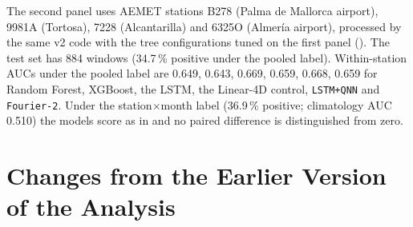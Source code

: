 \documentclass[11pt,a4paper]{article}
\begin{document}
The second panel uses AEMET stations B278 (Palma de Mallorca airport), 9981A (Tortosa), 7228 (Alcantarilla) and 6325O (Almería airport), processed by the same v2 code with the tree configurations tuned on the first panel (). The test set has 884 windows (34.7\,\% positive under the pooled label). Within-station AUCs under the pooled label are 0.649, 0.643, 0.669, 0.659, 0.668, 0.659 for Random Forest, XGBoost, the LSTM, the Linear-4D control, \texttt{LSTM+QNN} and \texttt{Fourier-2}. Under the station$\times$month label (36.9\,\% positive; climatology AUC 0.510) the models score as in  and no paired difference is distinguished from zero.

\begin{table}[htbp]
\centering
\caption{Second panel, station$\times$month label (884 test rows): 15-seed mean AUC (SD) and paired comparisons (DeLong $p$, year-block 95\,\% interval, DeLong MDE).}
\label{tab:panel2_sm}
{\small
{}}
\end{table}

\section{Changes from the Earlier Version of the Analysis}
\label{app:v1}
\end{document}
